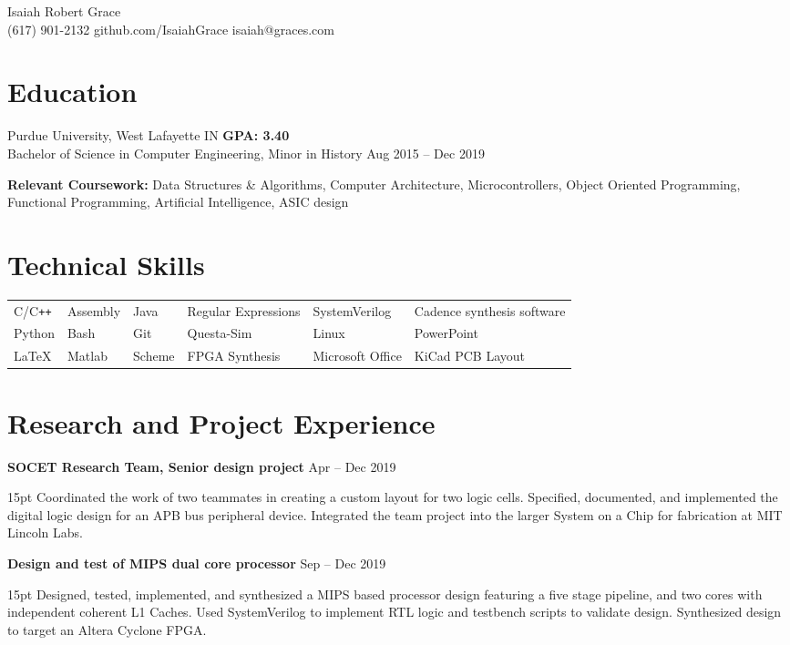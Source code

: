 \documentclass[10pt,letterpaper]{article}
\newcommand{\resumeItem}[3]{
	\textbf{#1} \hfill #2\\
	\begin{adjustwidth}{15pt}{}
	#3
	\end{adjustwidth}
}
\begin{document}
\raggedright
\begin{center}
	\Huge{Isaiah Robert Grace}\\
	\vspace{6pt}
	\large{(617) 901-2132 \hfill github.com/IsaiahGrace \hfill isaiah@graces.com}
\end{center}

\section*{Education}
Purdue University, West Lafayette IN \hfill \textbf{GPA: 3.40}\\
Bachelor of Science in Computer Engineering, Minor in History \hfill Aug 2015 -- Dec 2019

\vspace{2pt}
\textbf{Relevant Coursework:}
Data Structures \& Algorithms,
Computer Architecture,
Microcontrollers,
Object Oriented Programming,
Functional Programming,
Artificial Intelligence,
ASIC design


\section*{Technical Skills}
\begin{tabular*}{\textwidth}{llllll}
	C/C\texttt{++} & Assembly & Java   & Regular Expressions & SystemVerilog    & Cadence synthesis software\\
 	Python         & Bash     & Git    & Questa-Sim          & Linux            & PowerPoint\\
 	\LaTeX         & Matlab   & Scheme & FPGA Synthesis      & Microsoft Office & KiCad PCB Layout\\
\end{tabular*}


\section*{Research and Project Experience}
\resumeItem
{SOCET Research Team, Senior design project}
{Apr -- Dec 2019}
{Coordinated the work of two teammates in creating a custom layout for two logic cells. Specified, documented, and implemented the digital logic design for an APB bus peripheral device. Integrated the team project into the larger System on a Chip for fabrication at MIT Lincoln Labs.}

\resumeItem
{Design and test of MIPS dual core processor}
{Sep -- Dec 2019}
{Designed, tested, implemented, and synthesized a MIPS based processor design featuring a five stage pipeline, and two cores with independent coherent L1 Caches. Used SystemVerilog to implement RTL logic and testbench scripts to validate design. Synthesized design to target an Altera Cyclone FPGA.}
\end{document}
